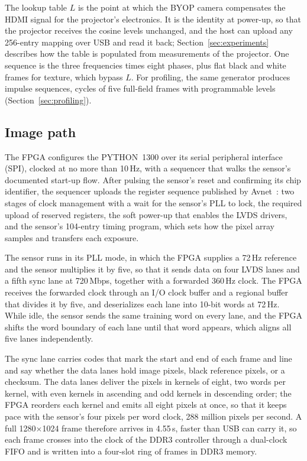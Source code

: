 \documentclass[10pt,journal,compsoc]{IEEEtran}
\newcommand{\SI}[2]{#1\,#2}
\newcommand{\second}{s}\newcommand{\hertz}{Hz}\newcommand{\metre}{m}
\begin{document}
The lookup table $L$ is the point at which the BYOP camera compensates the HDMI signal for the
projector's electronics. It is the identity at power-up, so that the projector receives the
cosine levels unchanged, and the host can upload any 256-entry mapping over USB and read it back;
Section~\ref{sec:experiments} describes how the table is populated from
measurements of the projector. One sequence is the three frequencies times eight phases, plus flat
black and white frames for texture, which bypass $L$. For profiling, the same generator produces
impulse sequences, cycles of five full-field frames with programmable levels
(Section~\ref{sec:profiling}).

\subsection{Image path}
\label{sec:imagepath}
The FPGA configures the PYTHON~1300 over its serial peripheral interface (SPI), clocked at no
more than \SI{10}{\mega\hertz}, with a sequencer that walks the sensor's documented start-up
flow. After pulsing the sensor's reset and confirming its chip identifier, the sequencer uploads
the register sequence published by Avnet~\cite{avnet_hdl}: two stages of clock management with a
wait for the sensor's PLL to lock, the required upload of reserved registers, the soft power-up
that enables the LVDS drivers, and the sensor's 104-entry timing program, which sets how the
pixel array samples and transfers each exposure.

The sensor runs in its PLL mode, in which the FPGA supplies a \SI{72}{\mega\hertz} reference and
the sensor multiplies it by five, so that it sends data on four LVDS lanes and a fifth sync lane
at \SI{720}{Mbps}, together with a forwarded \SI{360}{\mega\hertz} clock. The FPGA receives the
forwarded clock through an I/O clock buffer and a regional buffer that divides it by five, and
deserializes each lane into 10-bit words at \SI{72}{\mega\hertz}. While idle, the sensor sends
the same training word on every lane, and the FPGA shifts the word boundary of each lane until
that word appears, which aligns all five lanes independently.

The sync lane carries codes that mark the start and end of each frame and line and say whether
the data lanes hold image pixels, black reference pixels, or a checksum. The data lanes deliver
the pixels in kernels of eight, two words per kernel, with even kernels in ascending and odd
kernels in descending order; the FPGA reorders each kernel and emits all eight pixels at once,
so that it keeps pace with the sensor's four pixels per word clock, 288 million pixels per second.
A full 1280$\times$1024 frame therefore arrives in \SI{4.55}{\milli\second}, faster than USB
can carry it, so each frame crosses into the clock of the DDR3 controller through a dual-clock
FIFO and is written into a four-slot ring of frames in DDR3 memory.
\end{document}
